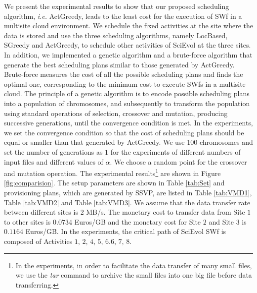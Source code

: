 We present the experimental results to show that our proposed scheduling algorithm, \textit{i.e.} ActGreedy, leads to the least cost for the execution of SWf in a multisite cloud environment.
We schedule the fixed activities at the site where the data is stored and use the three scheduling algorithms, namely LocBased, SGreedy and ActGreedy, to schedule other activities of SciEvol at the three sites. In addition, we implemented a genetic algorithm and a brute-force algorithm that generate the best scheduling plans similar to those generated by ActGreedy.
Brute-force measures the cost of all the possible scheduling plans and finds the optimal one, corresponding to the minimum cost to execute SWfs in a multisite cloud. The principle of a genetic algorithm \cite{Wieczorek2005} is to encode possible scheduling plans into a population of chromosomes, and subsequently to transform the population using standard operations of selection, crossover and mutation, producing successive generations, until the convergence condition is met. In the experiments, we set the convergence condition so that the cost of scheduling plans should be equal or smaller than that generated by ActGreedy. We use $100$ chromosomes and set the number of generations as $1$ for the experiments of different numbers of input files and different values of $\alpha$. We choose a random point for the crossover and mutation operation. The experimental results\footnote{In the experiments, in order to facilitate the data transfer of many small files, we use the \textit{tar} command to archive the small files into one big file before data transferring.} are shown in Figure \ref{fig:comparision}. The setup parameters are shown in Table \ref{tab:Set} and provisioning plans, which are generated by SSVP, are listed in Table \ref{tab:VMD1}, Table \ref{tab:VMD2} and Table \ref{tab:VMD3}. We assume that the data transfer rate between different sites is $2$ MB/s. The monetary cost to transfer data from Site $1$ to other sites is $0.0734$ Euros/GB and the monetary cost for Site $2$ and Site $3$ is $0.1164$ Euros/GB. In the experiments, the critical path of SciEvol SWf is composed of Activities $1$, $2$, $4$, $5$, $6.6$, $7$, $8$.


